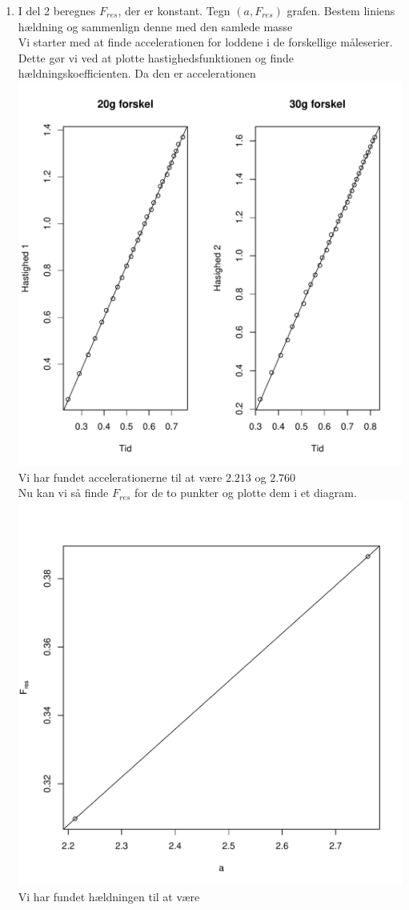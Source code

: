 \begin{enumerate}
\def\labelenumi{\arabic{enumi}.}
\item
  I del 2 beregnes \(F_{res}\), der er konstant. Tegn \((a, F_{res})\)
  grafen. Bestem liniens hældning og sammenlign denne med den samlede
  masse\\
  Vi starter med at finde accelerationen for loddene i de forskellige
  måleserier. Dette gør vi ved at plotte hastighedsfunktionen og finde
  hældningskoefficienten. Da den er accelerationen\\
  \includegraphics{opgave1.pdf} Vi har fundet accelerationerne til at
  være \(2.213\) og \(2.760\)\\
  Nu kan vi så finde \(F_{res}\) for de to punkter og plotte dem i et
  diagram.\\
  \includegraphics{opgave1acc.pdf} Vi har fundet hældningen til at være

\end{enumerate}
